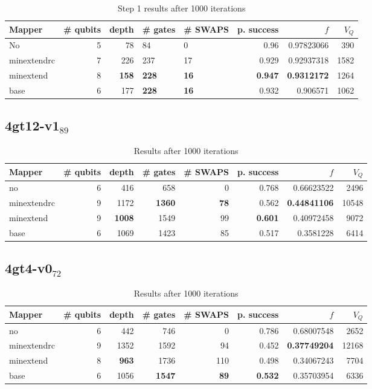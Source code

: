 \documentclass[11pt]{article}
\begin{document}
\begin{table}[H]
\caption{\label{tab:org5f35b24}
Step 1 results after 1000 iterations}
\centering
\small
\begin{tabular}{lrrllrrr}
\hline
Mapper & \# qubits & depth & \# gates & \# SWAPS & p. success & \(f\) & \(V_Q\)\\
\hline
No & 5 & 78 & 84 & 0 & 0.96 & 0.97823066 & 390\\
\hline
minextendrc & 7 & 226 & 237 & 17 & 0.929 & 0.92937318 & 1582\\
minextend & 8 & \textbf{158} & \textbf{228} & \textbf{16} & \textbf{0.947} & \textbf{0.9312172} & 1264\\
base & 6 & 177 & \textbf{228} & \textbf{16} & 0.932 & 0.906571 & 1062\\
\hline
\end{tabular}
\end{table}

\subsection{4gt12-v1\(_{\text{89}}\)}
\label{sec:org27e2a8b}

\begin{table}[H]
\caption{\label{tab:orgfbf17e1}
Results after 1000 iterations}
\centering
\small
\begin{tabular}{lrrrrrrr}
\hline
Mapper & \# qubits & depth & \# gates & \# SWAPS & p. success & \(f\) & \(V_Q\)\\
\hline
no & 6 & 416 & 658 & 0 & 0.768 & 0.66623522 & 2496\\
\hline
minextendrc & 9 & 1172 & \textbf{1360} & \textbf{78} & 0.562 & \textbf{0.44841106} & 10548\\
minextend & 9 & \textbf{1008} & 1549 & 99 & \textbf{0.601} & 0.40972458 & 9072\\
base & 6 & 1069 & 1423 & 85 & 0.517 & 0.3581228 & 6414\\
\hline
\end{tabular}
\end{table}


\subsection{4gt4-v0\(_{\text{72}}\)}
\label{sec:orgb05fbbe}

\begin{table}[H]
\caption{\label{tab:orge56d854}
Results after 1000 iterations}
\centering
\small
\begin{tabular}{lrrrrrrr}
\hline
Mapper & \# qubits & depth & \# gates & \# SWAPS & p. success & \(f\) & \(V_Q\)\\
\hline
no & 6 & 442 & 746 & 0 & 0.786 & 0.68007548 & 2652\\
\hline
minextendrc & 9 & 1352 & 1592 & 94 & 0.452 & \textbf{0.37749204} & 12168\\
minextend & 8 & \textbf{963} & 1736 & 110 & 0.498 & 0.34067243 & 7704\\
base & 6 & 1056 & \textbf{1547} & \textbf{89} & \textbf{0.532} & 0.35703954 & 6336\\
\hline
\end{tabular}
\end{table}
\end{document}
